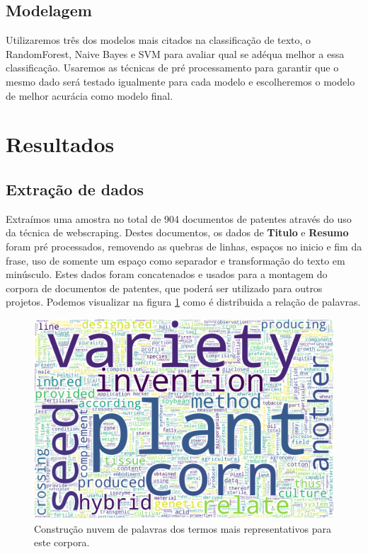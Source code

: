 \subsection{Modelagem}
Utilizaremos três dos modelos mais citados na classificação de texto, o RandomForest, Naive Bayes e SVM para avaliar qual se adéqua melhor a essa classificação. Usaremos as técnicas de pré processamento para garantir que o mesmo dado será testado igualmente para cada modelo e escolheremos o modelo de melhor acurácia como modelo final.


\section{Resultados}

\subsection{Extração de dados}

Extraímos uma amostra no total de 904 documentos de patentes através do uso da técnica de webscraping. Destes documentos, os dados de \textbf{Titulo} e \textbf{Resumo} foram pré processados, removendo as quebras de linhas, espaços no inicio e fim da frase, uso de somente um espaço como separador e transformação do texto em minúsculo. Estes dados foram concatenados e usados para a montagem do corpora de documentos de patentes, que poderá ser utilizado para outros projetos. Podemos visualizar na figura \ref{wordcloud_pre_image} como é distribuida a relação de palavras.

\begin{figure}[ht!]
	\centering
	\includegraphics[scale=0.3]{imagens/wordcloud_preprocess.png}
	\caption{Construção nuvem de palavras dos termos mais representativos para este corpora.
			 \label{wordcloud_pre_image}}
\end{figure}

